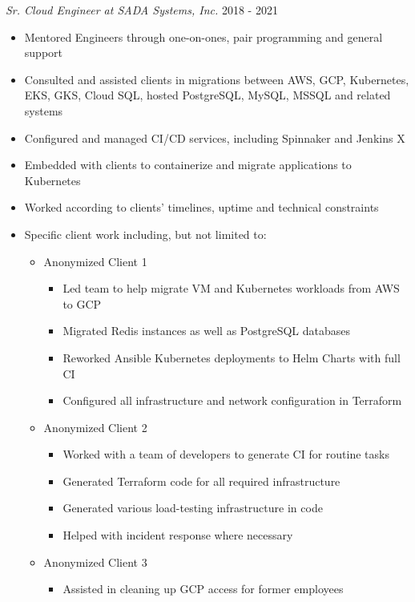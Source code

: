 \documentclass[line]{docs/resume/res}
\begin{document}
\begin{resume}
  {\sl Sr. Cloud Engineer at SADA Systems, Inc.} \hfill 2018 - 2021
  \begin{itemize} \itemsep -2pt
    \item Mentored Engineers through one-on-ones, pair programming and general support
    \item Consulted and assisted clients in migrations between AWS, GCP, Kubernetes, \\
      EKS, GKS, Cloud SQL, hosted PostgreSQL, MySQL, MSSQL and related systems
    \item Configured and managed CI/CD services, including Spinnaker and Jenkins X
    \item Embedded with clients to containerize and migrate applications to Kubernetes
    \item Worked according to clients' timelines, uptime and technical constraints
    \item Specific client work including, but not limited to:
    \begin{itemize} \itemsep -2pt
      \item Anonymized Client 1
      \begin{itemize} \itemsep -2pt
        \item Led team to help migrate VM and Kubernetes workloads from AWS to GCP
        \item Migrated Redis instances as well as PostgreSQL databases
        \item Reworked Ansible Kubernetes deployments to Helm Charts with full CI
        \item Configured all infrastructure and network configuration in Terraform
      \end{itemize}
      \item Anonymized Client 2
      \begin{itemize} \itemsep -2pt
        \item Worked with a team of developers to generate CI for routine tasks
        \item Generated Terraform code for all required infrastructure
        \item Generated various load-testing infrastructure in code
        \item Helped with incident response where necessary
      \end{itemize}
      \item Anonymized Client 3
      \begin{itemize} \itemsep -2pt
        \item Assisted in cleaning up GCP access for former employees

\end{itemize}
\end{itemize}
\end{itemize}
\end{resume}
\end{document}
